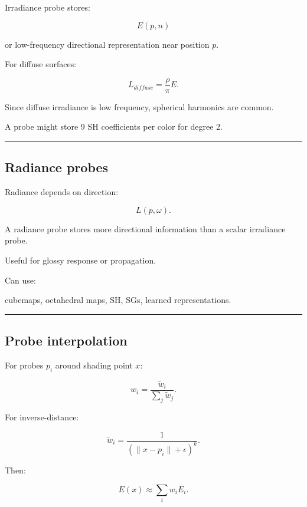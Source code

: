 Irradiance probe stores:

\[
E(p,n)
\]

or low-frequency directional representation near position \(p\).

For diffuse surfaces:

\[
L_{diffuse}
=
\frac{\rho}{\pi}
E.
\]

Since diffuse irradiance is low frequency, spherical harmonics are common.

A probe might store 9 SH coefficients per color for degree 2.

\begin{center}\rule{0.5\linewidth}{0.5pt}\end{center}

\subsection{Radiance probes}\label{04-visual-computing-ii-ch040-radiance-probes}

\hypertarget{04-visual-computing-ii-ch040-radiance-probes}{}

Radiance depends on direction:

\[
L(p,\omega).
\]

A radiance probe stores more directional information than a scalar irradiance probe.

Useful for glossy response or propagation.

Can use:

cubemaps, octahedral maps, SH, SGs, learned representations.

\begin{center}\rule{0.5\linewidth}{0.5pt}\end{center}

\subsection{Probe interpolation}\label{04-visual-computing-ii-ch040-probe-interpolation}

\hypertarget{04-visual-computing-ii-ch040-probe-interpolation}{}

For probes \(p_i\) around shading point \(x\):

\[
w_i=
\frac{
\tilde w_i
}{
\sum_j\tilde w_j
}.
\]

For inverse-distance:

\[
\tilde w_i=
\frac1{
(\|x-p_i\|+\epsilon)^k
}.
\]

Then:

\[
\boxed{
E(x)
\approx
\sum_iw_iE_i.
}
\]

